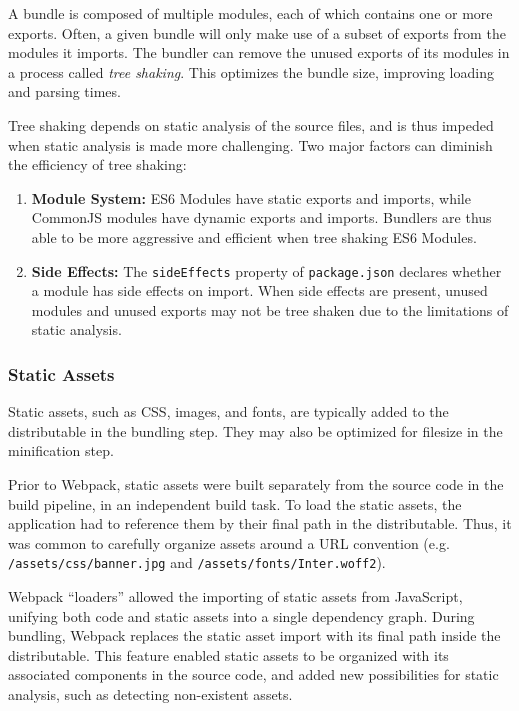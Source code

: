 \documentclass{article}
\begin{document}
A bundle is composed of multiple modules, each of which contains one or more exports. Often, a given
bundle will only make use of a subset of exports from the modules it imports. The bundler can remove
the unused exports of its modules in a process called \textit{tree shaking}. This optimizes the
bundle size, improving loading and parsing times.

Tree shaking depends on static analysis of the source files, and is thus impeded when static
analysis is made more challenging. Two major factors can diminish the efficiency of tree shaking:

\begin{enumerate}
  \item \textbf{Module System:} ES6 Modules have static exports and imports, while CommonJS modules
    have dynamic exports and imports. Bundlers are thus able to be more aggressive and efficient
    when tree shaking ES6 Modules.

  \item \textbf{Side Effects:} The \texttt{sideEffects} property of \texttt{package.json} declares
    whether a module has side effects on import. When side effects are present, unused modules and
    unused exports may not be tree shaken due to the limitations of static analysis.
\end{enumerate}

\subsubsection{Static Assets}

Static assets, such as CSS, images, and fonts, are typically added to the distributable in the
bundling step. They may also be optimized for filesize in the minification step.

Prior to Webpack, static assets were built separately from the source code in the build pipeline, in
an independent build task. To load the static assets, the application had to reference them by their
final path in the distributable. Thus, it was common to carefully organize assets around a URL
convention (e.g. \texttt{/assets/css/banner.jpg} and \texttt{/assets/fonts/Inter.woff2}).

Webpack ``loaders'' allowed the importing of static assets from JavaScript, unifying both code and
static assets into a single dependency graph. During bundling, Webpack replaces the static asset
import with its final path inside the distributable. This feature enabled static assets to be
organized with its associated components in the source code, and added new possibilities for static
analysis, such as detecting non-existent assets.
\end{document}
